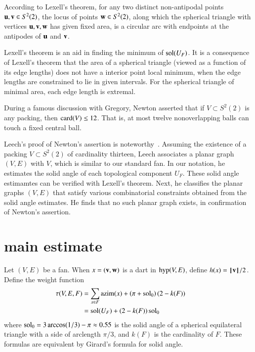 \documentclass{llncs}
\def\op#1{{\hbox{#1}}}
\begin{document}
\begin{remark}
According to Lexell's theorem, for any two distinct non-antipodal points ${\mathbf u},{\mathbf v}\in S^2(2)$,
the locus of points ${\mathbf w}\in S^2(2)$, along which
the spherical triangle with vertices ${\mathbf u},{\mathbf v},{\mathbf w}$ has given fixed area, is a circular arc
with endpoints at the antipodes of ${\mathbf u}$ and ${\mathbf v}$.

Lexell's theorem is an aid in finding the minimum of
  $\operatorname{sol}(U_F)$.
  It is a consequence of Lexell's theorem that the area of a spherical
  triangle (viewed as a function of its edge lengths) does not have a
  interior point local minimum, when the edge lengths are
  constrained to lie in given intervals.  For the spherical triangle of minimal area,
each  edge length is extremal.
%
%
\end{remark}

\begin{remark}
During a famous discussion with Gregory, Newton asserted that 
if $V\subset S^2(2)$ is any packing, then $\card(V)\le 12$. That is, at most
twelve nonoverlapping balls can touch a fixed central ball.  
%
%
%
%
  
 Leech's proof of Newton's assertion is
noteworthy~\cite{Leech:1956:MG}.  Assuming the existence of a packing
$V\subset S^2(2)$ of cardinality thirteen, Leech associates a planar graph
$(V,E)$ with $V$, which is similar to our standard fan.  In
our notation, he estimates the solid angle of each topological
component $U_F$.  These solid angle estimamtes can be verified with Lexell's theorem.
Next, he classifies the planar graphs $(V,E)$ that satisfy various
combinatorial constraints obtained from the solid angle estimates. He
finds that no such planar graph exists, in confirmation of Newton's
assertion.
\end{remark}

\section{main estimate}

Let $(V,E)$ be a fan.
When $x=({\mathbf v},{\mathbf w})$ is a dart in $\op{hyp}(V,E)$, define $h(x) = {\hbox{\ensuremath{\hspace{0.1em}|\hspace{-0.1em}|\hspace{0.1em}}}{\mathbf v}\hbox{\ensuremath{\hspace{0.1em}|\hspace{-0.1em}|\hspace{0.1em}}}}/2$.
Define the weight function
\begin{align}
  \tau(V,E,F) &=\sum_{x\in F} \op{azim}(x) 
  + \left(\pi+{\sol_0}\right) (2- k(F))\qquad\phantom{t}\vspace{6pt}\nonumber\\
  &= \sol(U_F) + (2- k(F))\sol_0 \vspace{6pt}\\
\label{eqn:tau-sol}
\end{align}
where $\operatorname{sol}_0=3\arccos(1/3)-\pi\approx 0.55$ is the solid angle of a
spherical equilateral triangle with a side of arclength $\pi/3$, and
$k(F)$ is the cardinality of $F$.
% 
These formulas are equivalent by Girard's formula for solid angle.
\end{document}
